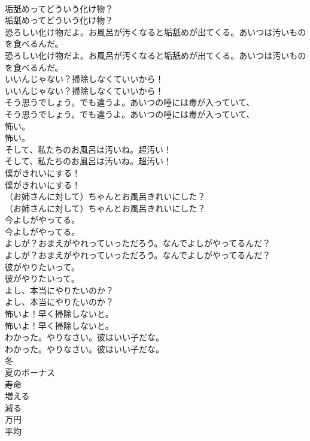 \documentclass[8pt]{extreport}
\begin{document}
\begin{CJK}{UTF8}{min}
\\	垢舐めってどういう化け物？	
\\	垢舐めってどういう化け物？ 
\\	恐ろしい化け物だよ。お風呂が汚くなると垢舐めが出てくる。あいつは汚いものを食べるんだ。	
\\	恐ろしい化け物だよ。お風呂が汚くなると垢舐めが出てくる。あいつは汚いものを食べるんだ。 
\\	いいんじゃない？掃除しなくていいから！	
\\	いいんじゃない？掃除しなくていいから！ 
\\	そう思うでしょう。でも違うよ。あいつの唾には毒が入っていて、	
\\	そう思うでしょう。でも違うよ。あいつの唾には毒が入っていて、 
\\	怖い。	
\\	怖い。 
\\	そして、私たちのお風呂は汚いね。超汚い！	
\\	そして、私たちのお風呂は汚いね。超汚い！ 
\\	僕がきれいにする！	
\\	僕がきれいにする！ 
\\	（お姉さんに対して）ちゃんとお風呂きれいにした？	
\\	（お姉さんに対して）ちゃんとお風呂きれいにした？ 
\\	今よしがやってる。	
\\	今よしがやってる。 
\\	よしが？おまえがやれっていっただろう。なんでよしがやってるんだ？	
\\	よしが？おまえがやれっていっただろう。なんでよしがやってるんだ？ 
\\	彼がやりたいって。	
\\	彼がやりたいって。 
\\	よし、本当にやりたいのか？	
\\	よし、本当にやりたいのか？ 
\\	怖いよ！早く掃除しないと。	
\\	怖いよ！早く掃除しないと。 
\\	わかった。やりなさい。彼はいい子だな。	
\\	わかった。やりなさい。彼はいい子だな。 
\\	冬
\\	夏のボーナス
\\	寿命
\\	増える
\\	減る
\\	万円
\\	平均

\end{CJK}
\end{document}
